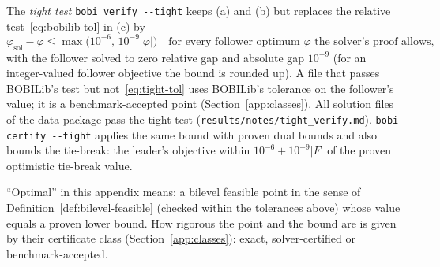 The \emph{tight test} \texttt{bobi verify -{}-tight} keeps (a) and (b) but
replaces the relative test~\eqref{eq:bobilib-tol} in (c) by
\begin{equation}\label{eq:tight-tol}
  \varphi_{\mathrm{sol}}-\varphi\le\max\bigl(10^{-6},\,10^{-9}|\varphi|\bigr)
  \quad\text{for every follower optimum $\varphi$ the solver's proof allows,}
\end{equation}
with the follower solved to zero relative gap and absolute gap $10^{-9}$ (for an
integer-valued follower objective the bound is rounded up). A file that passes
BOBILib's test but not~\eqref{eq:tight-tol} uses BOBILib's tolerance on the
follower's value; it is a benchmark-accepted point (Section~\ref{app:classes}).
All \NumTightFiles{} solution files of the data package pass the tight test
(\texttt{results/notes/tight\_verify.md}). \texttt{bobi certify -{}-tight} applies
the same bound with proven dual bounds and also bounds the tie-break: the
leader's objective within $10^{-6}+10^{-9}|F|$ of the proven optimistic
tie-break value.

``Optimal'' in this appendix means: a bilevel feasible point in the sense of
Definition~\ref{def:bilevel-feasible} (checked within the tolerances above)
whose value equals a proven lower bound. How rigorous the point and the bound
are is given by their certificate class (Section~\ref{app:classes}): exact,
solver-certified or benchmark-accepted.
